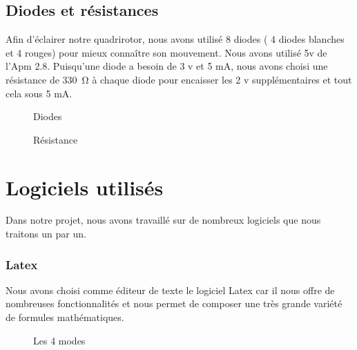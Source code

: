 	\subsection {Diodes  et résistances}
	Afin d'éclairer notre quadrirotor, nous avons utilisé 8 diodes ( 4 diodes blanches et 4  rouges) pour mieux connaître son mouvement. Nous avons utilisé 5v  de l'Apm 2.8. Puisqu'une diode a besoin de 3 v et 5 mA, nous avons choisi une résistance de \SI{330}{\ohm} à chaque diode pour encaisser les 2 v supplémentaires et tout cela sous 5 mA.
	\begin{figure}[h]
		\centering
		\begin{minipage}{0.49\textwidth}
			\caption{Diodes}
			\label{fig:my_label1}
		\end{minipage}
		\begin{minipage}{0.49\textwidth}
			\caption{Résistance}
			\label{fig:my_label}
		\end{minipage}
	\end{figure}
	\section{Logiciels utilisés}
	Dans notre projet, nous avons travaillé sur de nombreux logiciels que nous traitons un par un.
	\subsubsection{Latex}
	Nous avons choisi comme éditeur de texte le logiciel Latex car il nous  offre de nombreuses fonctionnalités et nous permet de composer une très grande variété de formules mathématiques.
	\begin{figure}[h]
		\begin{center}
			\centering
		\end{center}
		\caption{Les 4 modes}
	\end{figure}
